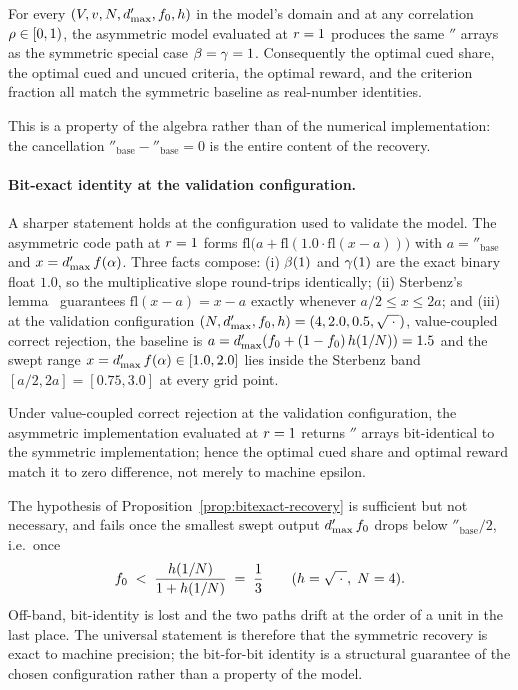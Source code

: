 \begin{proposition}
\label{prop:symmetric-recovery}
For every $(V, v, N, d'_{\max}, f_0, h)$ in the model's
domain and at any correlation $\rho \in [0, 1)$, the asymmetric model
evaluated at $r = 1$ produces the same $\dprime$ arrays as the
symmetric special case $\beta = \gamma = 1$. Consequently the optimal
cued share, the optimal cued and uncued criteria, the optimal reward, and
the criterion fraction all match the symmetric baseline as real-number
identities.
\end{proposition}

This is a property of the algebra rather than of the numerical
implementation: the cancellation
$\dprime_{\mathrm{base}} - \dprime_{\mathrm{base}} = 0$ is the entire
content of the recovery.

\paragraph{Bit-exact identity at the validation configuration.}
A sharper statement holds at the configuration used to validate the
model. The asymmetric code path at $r = 1$ forms
$\mathrm{fl}\big(a + \mathrm{fl}(1.0 \cdot \mathrm{fl}(x - a))\big)$ with
$a = \dprime_{\mathrm{base}}$ and $x = d'_{\max}\, f(\alpha)$. Three
facts compose: (i) $\beta(1)$ and $\gamma(1)$ are the exact binary
float $1.0$, so the multiplicative slope round-trips identically; (ii)
Sterbenz's lemma~\cite{Sterbenz1974, Goldberg1991} guarantees
$\mathrm{fl}(x - a) = x - a$ exactly whenever $a/2 \le x \le 2a$; and
(iii) at the validation configuration
$(N, d'_{\max}, f_0, h) = (4, 2.0, 0.5, \sqrt{\;\cdot\;})$, value-coupled
correct rejection, the baseline is
$a = d'_{\max}(f_0 + (1 - f_0)\,h(1/N)) = 1.5$ and the swept range
$x = d'_{\max}\, f(\alpha) \in [1.0, 2.0]$ lies inside the Sterbenz band
$[a/2, 2a] = [0.75, 3.0]$ at every grid point.

\begin{proposition}
\label{prop:bitexact-recovery}
Under value-coupled correct rejection at the validation configuration,
the asymmetric implementation evaluated at $r = 1$ returns
$\dprime$ arrays bit-identical to the symmetric implementation; hence the
optimal cued share and optimal reward match it to zero difference, not
merely to machine epsilon.
\end{proposition}

The hypothesis of Proposition~\ref{prop:bitexact-recovery} is sufficient
but not necessary, and fails once the smallest swept output $d'_{\max}\,
f_0$ drops below $\dprime_{\mathrm{base}}/2$, i.e.\ once
\begin{equation}
  f_0 \;<\; \frac{h(1/N)}{1 + h(1/N)} \;=\; \frac{1}{3}
  \qquad (h = \sqrt{\;\cdot\;},\; N = 4).
  \label{eq:sterbenz-threshold}
\end{equation}
Off-band, bit-identity is lost and the two paths drift at the order of a
unit in the last place. The universal statement is therefore that the
symmetric recovery is exact to machine precision; the bit-for-bit
identity is a structural guarantee of the chosen configuration rather
than a property of the model.

